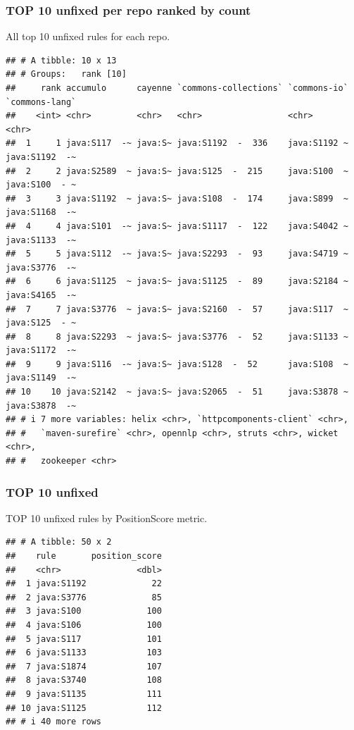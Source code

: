\documentclass[
]{article}
\begin{document}
\subsubsection{TOP 10 unfixed per repo ranked by
count}\label{top-10-unfixed-per-repo-ranked-by-count}

All top 10 unfixed rules for each repo.

\begin{verbatim}
## # A tibble: 10 x 13
## # Groups:   rank [10]
##     rank accumulo      cayenne `commons-collections` `commons-io` `commons-lang`
##    <int> <chr>         <chr>   <chr>                 <chr>        <chr>         
##  1     1 java:S117  -~ java:S~ java:S1192  -  336    java:S1192 ~ java:S1192  -~
##  2     2 java:S2589  ~ java:S~ java:S125  -  215     java:S100  ~ java:S100  - ~
##  3     3 java:S1192  ~ java:S~ java:S108  -  174     java:S899  ~ java:S1168  -~
##  4     4 java:S101  -~ java:S~ java:S1117  -  122    java:S4042 ~ java:S1133  -~
##  5     5 java:S112  -~ java:S~ java:S2293  -  93     java:S4719 ~ java:S3776  -~
##  6     6 java:S1125  ~ java:S~ java:S1125  -  89     java:S2184 ~ java:S4165  -~
##  7     7 java:S3776  ~ java:S~ java:S2160  -  57     java:S117  ~ java:S125  - ~
##  8     8 java:S2293  ~ java:S~ java:S3776  -  52     java:S1133 ~ java:S1172  -~
##  9     9 java:S116  -~ java:S~ java:S128  -  52      java:S108  ~ java:S1149  -~
## 10    10 java:S2142  ~ java:S~ java:S2065  -  51     java:S3878 ~ java:S3878  -~
## # i 7 more variables: helix <chr>, `httpcomponents-client` <chr>,
## #   `maven-surefire` <chr>, opennlp <chr>, struts <chr>, wicket <chr>,
## #   zookeeper <chr>
\end{verbatim}

\subsubsection{TOP 10 unfixed}\label{top-10-unfixed}

TOP 10 unfixed rules by PositionScore metric.

\begin{verbatim}
## # A tibble: 50 x 2
##    rule       position_score
##    <chr>               <dbl>
##  1 java:S1192             22
##  2 java:S3776             85
##  3 java:S100             100
##  4 java:S106             100
##  5 java:S117             101
##  6 java:S1133            103
##  7 java:S1874            107
##  8 java:S3740            108
##  9 java:S1135            111
## 10 java:S1125            112
## # i 40 more rows
\end{verbatim}
\end{document}

